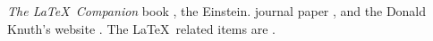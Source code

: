 


	\maketitle
	\thispagestyle{empty}

	\newpage
	\tableofcontents

	\newpage	
	
	
	\newpage	
	
	
	\newpage	
	

	\textit{The \LaTeX\ Companion} book \cite{latexcompanion}, the Einstein.
	journal paper \cite{einstein}, and the Donald Knuth's website \cite{knuthwebsite}. 
	The \LaTeX\ related items are \cite{latexcompanion,knuthwebsite} .
	\newpage	
	
	
		
